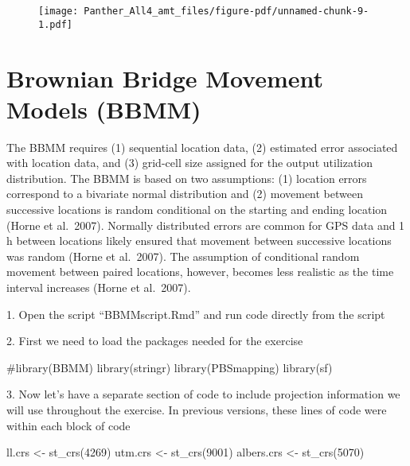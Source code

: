 \documentclass[
  letterpaper,
]{book}
\newenvironment{Shaded}{\begin{snugshade}}{\end{snugshade}}
\newcommand{\CommentTok}[1]{\textcolor[rgb]{0.37,0.37,0.37}{#1}}
\newcommand{\DecValTok}[1]{\textcolor[rgb]{0.68,0.00,0.00}{#1}}
\newcommand{\FunctionTok}[1]{\textcolor[rgb]{0.28,0.35,0.67}{#1}}
\newcommand{\NormalTok}[1]{\textcolor[rgb]{0.00,0.23,0.31}{#1}}
\newcommand{\OtherTok}[1]{\textcolor[rgb]{0.00,0.23,0.31}{#1}}
\begin{document}
\begin{figure}[H]

{\centering \texttt{[image: Panther\_All4\_amt\_files/figure-pdf/unnamed-chunk-9-1.pdf]}

}

\end{figure}

\hypertarget{brownian-bridge-movement-models-bbmm}{%
\chapter{Brownian Bridge Movement Models
(BBMM)}\label{brownian-bridge-movement-models-bbmm}}

The BBMM requires (1) sequential location data, (2) estimated error
associated with location data, and (3) grid-cell size assigned for the
output utilization distribution. The BBMM is based on two assumptions:
(1) location errors correspond to a bivariate normal distribution and
(2) movement between successive locations is random conditional on the
starting and ending location (Horne et al.~2007). Normally distributed
errors are common for GPS data and 1 h between locations likely ensured
that movement between successive locations was random (Horne et
al.~2007). The assumption of conditional random movement between paired
locations, however, becomes less realistic as the time interval
increases (Horne et al.~2007).

1. Open the script ``BBMMscript.Rmd'' and run code directly from the
script

2. First we need to load the packages needed for the exercise

\begin{Shaded}
\begin{Highlighting}[]
\CommentTok{\#library(BBMM)}
\FunctionTok{library}\NormalTok{(stringr)}
\FunctionTok{library}\NormalTok{(PBSmapping)}
\FunctionTok{library}\NormalTok{(sf)}
\end{Highlighting}
\end{Shaded}

3. Now let's have a separate section of code to include projection
information we will use throughout the exercise. In previous versions,
these lines of code were within each block of code

\begin{Shaded}
\begin{Highlighting}[]
\NormalTok{ll.crs }\OtherTok{\textless{}{-}} \FunctionTok{st\_crs}\NormalTok{(}\DecValTok{4269}\NormalTok{)}
\NormalTok{utm.crs }\OtherTok{\textless{}{-}} \FunctionTok{st\_crs}\NormalTok{(}\DecValTok{9001}\NormalTok{)}
\NormalTok{albers.crs }\OtherTok{\textless{}{-}} \FunctionTok{st\_crs}\NormalTok{(}\DecValTok{5070}\NormalTok{)}
\end{Highlighting}
\end{Shaded}
\end{document}
